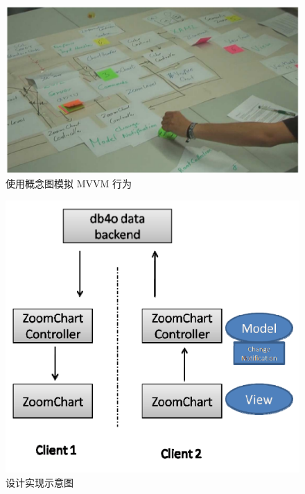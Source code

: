 \begin{figure}
  \begin{center}
    \includegraphics[scale=0.3]{figures/translation/translation_api_fig5.png}\\
    使用概念图模拟 MVVM 行为
  \end{center}
\end{figure}

\begin{figure}
  \begin{center}
    \includegraphics[scale=0.3]{figures/translation/translation_api_fig6.png}\\
    设计实现示意图
  \end{center}
\end{figure}

